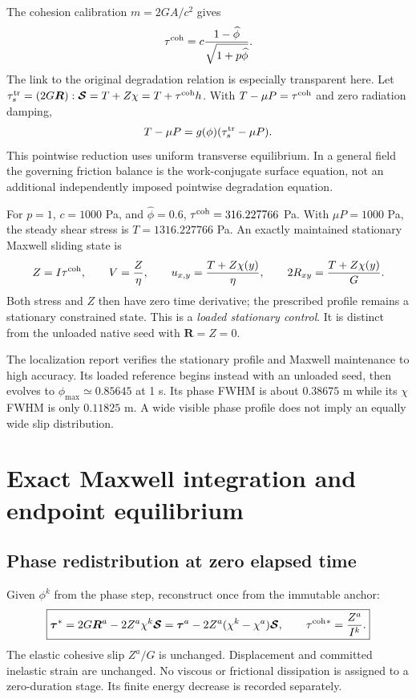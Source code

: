 \documentclass[11pt,a4paper]{article}
\newcommand{\Smat}{\bm{\mathcal S}}
\newcommand{\tauv}{\bm\tau}
\newcommand{\R}{\bm R}
\newcommand{\qcoh}{\tau^{\rm coh}}
\begin{document}
The cohesion calibration $m=2GA/c^2$ gives
\begin{equation}
 \qcoh=c\frac{1-\widehat\phi}{\sqrt{1+p\widehat\phi}}.
 \label{eq:q-profile}
\end{equation}
The link to the original degradation relation is especially transparent here.
Let $\tau_s^{\rm tr}=(2G\R):\Smat=T+Z\chi=T+\qcoh h$.
With $T-\mu P=\qcoh$ and zero radiation damping,
\begin{equation}
 T-\mu P=g(\phi)(\tau_s^{\rm tr}-\mu P).
\end{equation}
This pointwise reduction uses uniform transverse equilibrium. In a general
field the governing friction balance is the work-conjugate surface equation,
not an additional independently imposed pointwise degradation equation.

For $p=1$, $c=1000$ Pa, and $\widehat\phi=0.6$,
$\qcoh=316.227766$ Pa. With $\mu P=1000$ Pa, the steady shear stress is
$T=1316.227766$ Pa. An exactly maintained stationary Maxwell sliding state is
\begin{equation}
 Z=I\qcoh,\qquad V=\frac Z\eta,\qquad
 u_{x,y}=\frac{T+Z\chi(y)}\eta,\qquad
 2R_{xy}=\frac{T+Z\chi(y)}G.
 \label{eq:stationary-maxwell}
\end{equation}
Both stress and $Z$ then have zero time derivative; the prescribed profile
remains a stationary constrained state. This is a \emph{loaded stationary
control}. It is distinct from the unloaded native seed with $\R=Z=0$.

The localization report verifies the stationary profile and Maxwell maintenance
to high accuracy. Its loaded reference begins instead with an unloaded seed,
then evolves to $\phi_{\max}\simeq0.85645$ at 1 s. Its phase FWHM is about
$0.38675$ m while its $\chi$ FWHM is only $0.11825$ m. A wide visible phase
profile does not imply an equally wide slip distribution.

\section{Exact Maxwell integration and endpoint equilibrium}
\label{sec:time}

\subsection{Phase redistribution at zero elapsed time}

Given $\phi^k$ from the phase step, reconstruct once from the immutable anchor:
\begin{equation}
 \boxed{\tauv^*=2G\R^a-2Z^a\chi^k\Smat
   =\tauv^a-2Z^a(\chi^k-\chi^a)\Smat,\qquad
 \qcoh{}^*=\frac{Z^a}{I^k}.}
 \label{eq:jump}
\end{equation}
The elastic cohesive slip $Z^a/G$ is unchanged. Displacement and committed
inelastic strain are unchanged. No viscous or frictional dissipation is assigned
to a zero-duration stage. Its finite energy decrease is recorded separately.
\end{document}
